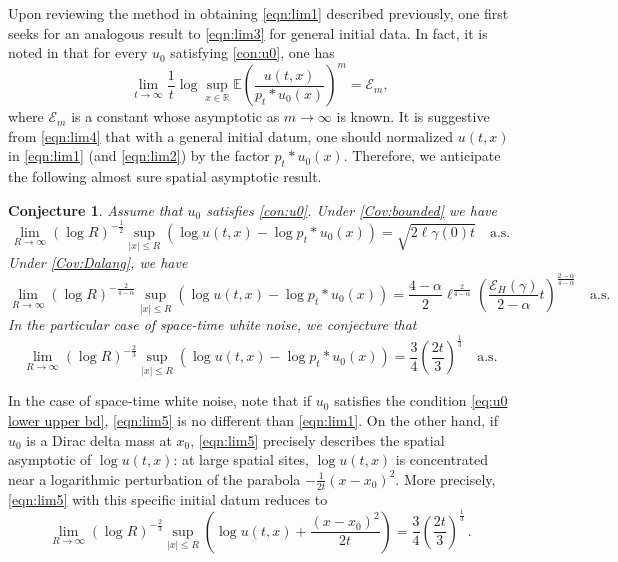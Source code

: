\documentclass[12pt,reqno]{amsart}
\newtheorem{conjecture}[theorem]{Conjecture}
\theoremstyle{remark}
\newcommand{\1}{\mathbf{1}}
\def\RR{\mathbb{R}}
\def\EE{\mathbb{E}}
\def\cee{{\mathcal E}}
\def\lt{\left}
\def\rt{\right}
\begin{document}
	Upon reviewing the method in obtaining \eqref{eqn:lim1} described previously, one first seeks for an analogous result to \eqref{eqn:lim3} for general initial data. In fact, it is noted in \cite{HLN15} that for every $u_0$ satisfying \eqref{con:u0}, one has
	\begin{equation}\label{eqn:lim4}
		\lim_{t\to\infty}\frac1t\log\sup_{x\in\RR} \EE\lt(\frac{u(t,x)}{p_t*u_0(x)} \rt)^m=\cee_m,	
	\end{equation}
	where $\cee_m$ is a constant whose asymptotic as $m\to\infty$ is known. 
	It is suggestive from \eqref{eqn:lim4} that with a general initial datum, one should normalized $u(t,x)$ in \eqref{eqn:lim1} (and \eqref{eqn:lim2}) by the factor $p_t*u_0(x)$. Therefore, we anticipate the following almost sure spatial asymptotic result.
	\begin{conjecture}\label{conjecture}
		Assume that $u_0$ satisfies \eqref{con:u0}. Under \ref{Cov:bounded} we have
		\begin{equation}\label{coj:h1}
			\lim_{R\to\infty}(\log R)^{-\frac12} \sup_{|x|\le R}\lt(\log u(t,x)-\log p_t*u_0(x) \rt)=\sqrt{2\ell \gamma(0)t}\quad \mathrm{a.s.}
		\end{equation}
		Under \ref{Cov:Dalang}, we have
		\begin{equation}\label{coj:h2}
				\lim_{R\to\infty}(\log R)^{-\frac2{4- \alpha}}\sup_{|x|\le R}\lt(\log u(t,x)-\log p_t*u_0(x) \rt)=\frac{4- \alpha}2\ell^{\frac2{4- \alpha}} \lt(\frac{\cee_H(\gamma)}{2- \alpha}t \rt)^{\frac{2- \alpha}{4- \alpha}} \quad \mathrm{a.s.}
		\end{equation}	 
		In the particular case of space-time white noise, we conjecture that
		\begin{equation}\label{eqn:lim5}
			\lim_{R\to\infty}(\log R)^{-\frac23}{\sup_{|x|\le R}(\log u(t,x)-\log p_t*u_0(x))}={\frac34 \lt(\frac{2t}3\rt)^{\frac13} }\quad \mathrm{a.s.}
		\end{equation}
	\end{conjecture} 
	In the case of space-time white noise, note that if $u_0$ satisfies the condition \eqref{eq:u0 lower upper bd}, \eqref{eqn:lim5} is no different than \eqref{eqn:lim1}. On the other hand, if $u_0$ is a Dirac delta mass at $x_0$, \eqref{eqn:lim5} precisely describes the spatial asymptotic of $\log u(t,x)$: at large spatial sites, $\log u(t,x)$ is concentrated near a logarithmic perturbation of the parabola $-\frac{1}{2t} (x-x_0)^2$. More precisely, \eqref{eqn:lim5} with this specific initial datum reduces to
	\begin{equation}\label{eqn:lim6}
		\lim_{R\to\infty}(\log R)^{-\frac23} \sup_{|x|\le R}\lt(\log u(t,x)+\frac{(x-x_0)^2}{2t} \rt)={\frac34 \lt(\frac{2t}3\rt)^{\frac13}}\,.
	\end{equation}
\end{document}
